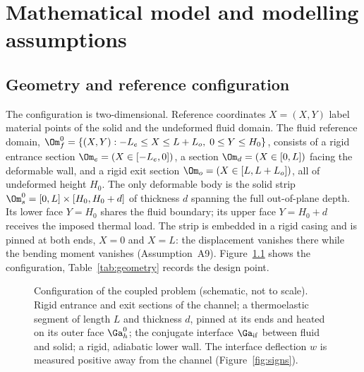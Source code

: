 \chapter{Mathematical model and modelling assumptions}
\label{ch:model}

\section{Geometry and reference configuration}
\label{sec:domains}

The configuration is two-dimensional. Reference coordinates $X=(X,Y)$ label material points of the
solid and the undeformed fluid domain. The fluid reference domain,
$\Om_f^0=\{(X,Y):-L_e\le X\le L+L_o,\;0\le Y\le H_0\}$,
consists of a rigid entrance section $\Om_e=(X\in[-L_e,0])$, a section $\Om_d=(X\in[0,L])$ facing
the deformable wall, and a rigid exit section $\Om_o=(X\in[L,L+L_o])$, all of undeformed height
$H_0$. The only deformable body is the solid strip
$\Om_s^0=[0,L]\times[H_0,H_0+d]$
of thickness $d$ spanning the full out-of-plane depth. Its lower face $Y=H_0$ shares the fluid
boundary; its upper face $Y=H_0+d$ receives the imposed thermal load. The strip is embedded in a
rigid casing and is pinned at both ends, $X=0$ and $X=L$: the displacement vanishes there while the
bending moment vanishes (Assumption~A9). Figure~\ref{fig:geometry} shows the configuration,
Table~\ref{tab:geometry} records the design point.

\begin{figure}[t]
\centering

\caption{Configuration of the coupled problem (schematic, not to scale). Rigid entrance and exit
sections of the channel; a thermoelastic segment of length $L$ and thickness $d$, pinned at its
ends and heated on its outer face $\Ga_h^0$; the conjugate interface $\Ga_{\mathrm{if}}$ between
fluid and solid; a rigid, adiabatic lower wall. The interface deflection $w$ is measured positive
away from the channel (Figure~\ref{fig:signs}).}
\label{fig:geometry}
\end{figure}

